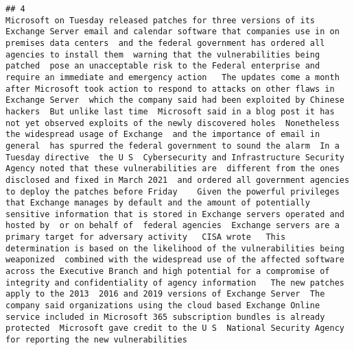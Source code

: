 \documentclass[
]{article}
\begin{document}
\begin{verbatim}
## 4                                                                                                                                                                                                                                                                                                                                                                                                                                                                                                                                                                                                                                                                                          Microsoft on Tuesday released patches for three versions of its Exchange Server email and calendar software that companies use in on premises data centers  and the federal government has ordered all agencies to install them  warning that the vulnerabilities being patched  pose an unacceptable risk to the Federal enterprise and require an immediate and emergency action   The updates come a month after Microsoft took action to respond to attacks on other flaws in Exchange Server  which the company said had been exploited by Chinese hackers  But unlike last time  Microsoft said in a blog post it has not yet observed exploits of the newly discovered holes  Nonetheless  the widespread usage of Exchange  and the importance of email in general  has spurred the federal government to sound the alarm  In a Tuesday directive  the U S  Cybersecurity and Infrastructure Security Agency noted that these vulnerabilities are  different from the ones disclosed and fixed in March 2021  and ordered all government agencies to deploy the patches before Friday    Given the powerful privileges that Exchange manages by default and the amount of potentially sensitive information that is stored in Exchange servers operated and hosted by  or on behalf of  federal agencies  Exchange servers are a primary target for adversary activity   CISA wrote   This determination is based on the likelihood of the vulnerabilities being weaponized  combined with the widespread use of the affected software across the Executive Branch and high potential for a compromise of integrity and confidentiality of agency information   The new patches apply to the 2013  2016 and 2019 versions of Exchange Server  The company said organizations using the cloud based Exchange Online service included in Microsoft 365 subscription bundles is already protected  Microsoft gave credit to the U S  National Security Agency for reporting the new vulnerabilities 

\end{verbatim}
\end{document}
